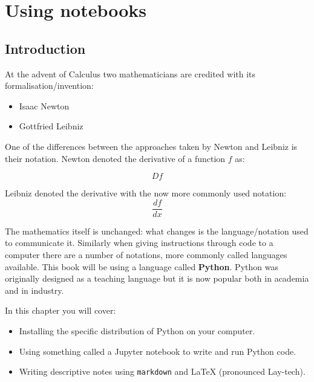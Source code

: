 \chapter{Using notebooks}
\label{chp:using_notebooks}

\section{Introduction}
At the advent of Calculus two mathematicians are credited with its
formalisation/invention:

\begin{itemize}
    \item Isaac Newton
    \item Gottfried Leibniz
\end{itemize}

One of the differences between the approaches taken by Newton and Leibniz is
their notation. Newton denoted the derivative of a function \(f\) as:

\begin{equation*}
Df
\end{equation*}

Leibniz denoted the derivative with the now more commonly used notation:
\begin{equation*}
\frac{df}{dx}
\end{equation*}

The mathematics itself is unchanged: what changes is the language/notation used
to communicate it. Similarly when giving instructions through code to a computer there are a number
of notations, more commonly called languages available.
This book will be using a language called \textbf{Python}.
Python was originally designed as a teaching language but it is now popular both
in academia and in industry.

\begin{note}
In this chapter you will cover:
\begin{itemize}
\item 
Installing the specific distribution of Python on your computer.

\item 
Using something called a Jupyter notebook to write and run Python code.

\item Writing descriptive notes using \texttt{markdown} and \LaTeX\; (pronounced
    Lay-tech).

\end{itemize}
\end{note}

